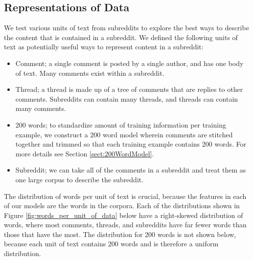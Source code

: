 \documentclass[11pt]{article}[twocolumn]
\begin{document}
\subsection{Representations of Data}
We test various units of text from subreddits to explore the best ways to describe the content that is contained in a subreddit.  We defined the following units of text as potentially useful ways to represent content in a subreddit:
\begin{itemize}
    \item Comment; a single comment is posted by a single author, and has one body of text.  Many comments exist within a subreddit.
    \item Thread; a thread is made up of a tree of comments that are replies to other comments.  Subreddits can contain many threads, and threads can contain many comments.
    \item 200 words; to standardize amount of training information per training example, we construct a 200 word model wherein comments are stitched together and trimmed so that each training example contains 200 words. For more details see Section \ref{sect:200WordModel}.
    \item Subreddit; we can take all of the comments in a subreddit and treat them as one large corpus to describe the subreddit.
\end{itemize}


The distribution of words per unit of text is crucial, because the features in each of our models are the words in the corpora.  Each of the distributions shown in Figure \ref{fig:words_per_unit_of_data} below have a right-skewed distribution of words, where most comments, threads, and subreddits have far fewer words than those that have the most.  The distribution for 200 words is not shown below, because each unit of text contains 200 words and is therefore a uniform distribution.
\end{document}
